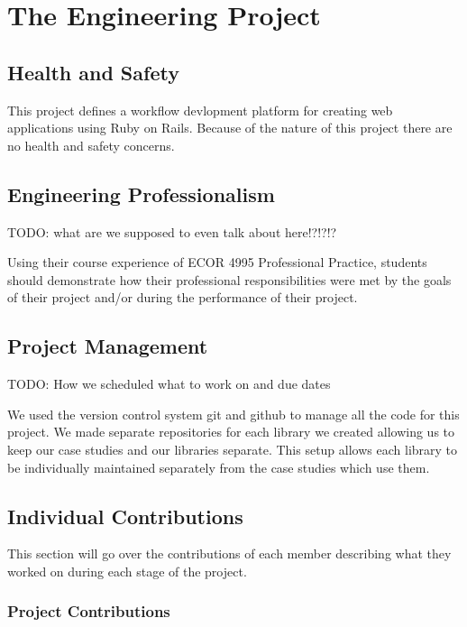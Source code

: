 \documentclass[document.tex]{subfiles}
\begin{document}
\chapter{The Engineering Project}

\section{Health and Safety}

This project defines a workflow devlopment platform for creating web applications using Ruby on Rails. Because of the nature of this project there are no health and safety concerns.

\section{Engineering Professionalism}

TODO: what are we supposed to even talk about here!?!?!?

Using their course experience of ECOR 4995 Professional Practice, students should demonstrate how their professional responsibilities were met by the goals of their project and/or during the performance of their project.

\section{Project Management}

TODO: How we scheduled what to work on and due dates

We used the version control system git and github to manage all the code for this project. We made separate repositories for each library we created allowing us to keep our case studies and our libraries separate. This setup allows each library to be individually  maintained separately from the case studies which use them. 

\section{Individual Contributions}

This section will go over the contributions of each member describing what they worked on during each stage of the project.

\subsection{Project Contributions}
\end{document}
